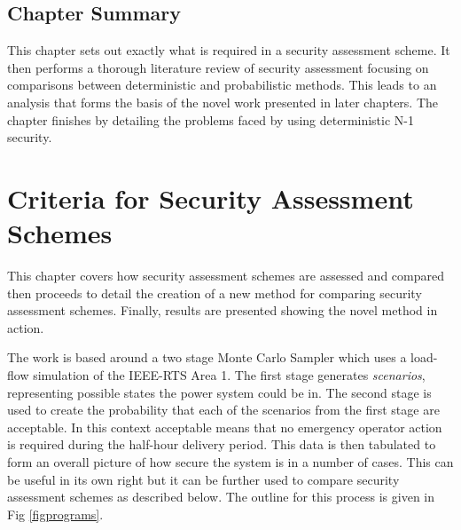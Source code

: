 \documentclass[a4paper,oneside,12pt]{report}
\begin{document}
\section{Chapter Summary}

This chapter sets out exactly what is required in a security assessment scheme. It then performs a thorough literature review of security assessment focusing on comparisons between deterministic and probabilistic methods. This leads to an analysis that forms the basis of the novel work presented in later chapters. The chapter finishes by detailing the problems faced by using deterministic N-1 security.







\chapter{Criteria for Security Assessment Schemes}\label{sec_compsas}

This chapter covers how security assessment schemes are assessed and compared then proceeds to detail the creation of a new method for comparing security assessment schemes. Finally, results are presented showing the novel method in action.

The work is based around a two stage Monte Carlo Sampler which uses a load-flow simulation of the IEEE-RTS Area 1. The first stage generates \emph{scenarios}, representing possible states the power system could be in. The second stage is used to create the probability that each of the scenarios from the first stage are acceptable. In this context acceptable means that no emergency operator action is required during the half-hour delivery period. This data is then tabulated to form an overall picture of how secure the system is in a number of cases. This can be useful in its own right but it can be further used to compare security assessment schemes as described below. The outline for this process is given in Fig \ref{figprograms}.
\end{document}
